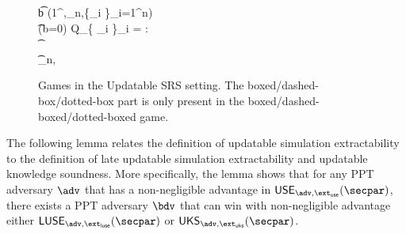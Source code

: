 \begin{figure}[!ht]
\begin{center}
{\begin{minipage}[t]{0.37\linewidth}
{			\t b \gets \verifyCRS(1^\secpar,\srs_n,\{\rho_i \}_{i=1}^{n})\\
			\t \pcif (b=0) \vee Q_\srs \cap \{ \rho_i \}_i = \emptyset: \pcreturn \bot \\
			\t {} \\
			\t \srs \gets \srs_n, \pcreturn \srs \\
			\pcelse \pcreturn \bot
		}
	\end{minipage}
	}
		\caption{Games in the Updatable SRS setting. The boxed/dashed-box/dotted-box part is only present in the boxed/dashed-boxed/dotted-boxed game.} 
		\label{fig:upd}
	\end{center}
\end{figure}

The following lemma relates the definition of updatable simulation extractability to the definition of late updatable simulation extractability and updatable knowledge soundness. More specifically, the lemma shows that for any PPT adversary $\advse$ that has a non-negligible advantage in $\USE_{\advse,\ext_{\use}}(\secpar)$, there exists a PPT adversary $\bdv$ that can win with non-negligible advantage either $\LUSE_{\advse,\ext_{\luse}}(\secpar)$ or $\UKS_{\advse,\ext_{\uks}}(\secpar)$.

